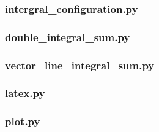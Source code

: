 \subsubsection{intergral\_configuration.py}


\subsubsection{double\_integral\_sum.py}


\subsubsection{vector\_line\_integral\_sum.py}


\subsubsection{latex.py}


\subsubsection{plot.py}
